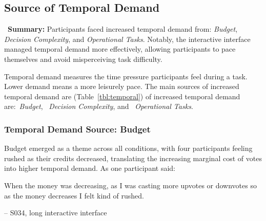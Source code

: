 \subsection{Source of Temporal Demand} 
\label{sec:temporal}
\vspace{5pt}

\begin{tldrbox}
    \faInfoCircle~\xspace\textbf{Summary:} Participants faced increased temporal demand from: \textit{Budget}, \textit{Decision Complexity}, and \textit{Operational Tasks}. Notably, the interactive interface managed temporal demand more effectively, allowing participants to pace themselves and avoid misperceiving task difficulty.
\end{tldrbox}

Temporal demand measures the time pressure participants feel during a task. Lower demand means a more leisurely pace. The main sources of increased temporal demand are (Table~\ref{tbl:temporal}) of increased temporal demand are:~\textit{Budget}, ~\textit{Decision Complexity}, and ~\textit{Operational Tasks}. 

\subsubsection{Temporal Demand Source: Budget}
Budget emerged as a theme across all conditions, with four participants feeling rushed as their credits decreased, translating the increasing marginal cost of votes into higher temporal demand. As one participant said:

\begin{displayquote}
When the money was decreasing, as I was casting more upvotes or downvotes so as the money decreases I felt kind of rushed.
            
\noindent \hfill -- S034, long interactive interface
\end{displayquote}


